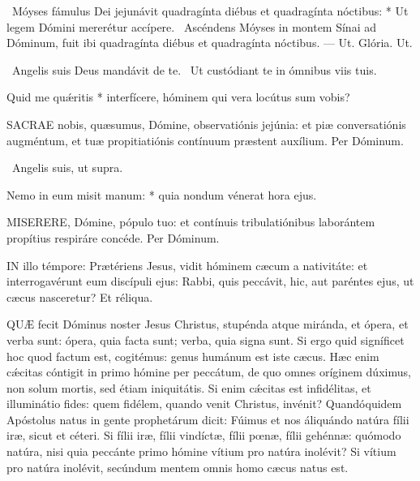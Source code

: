 \R\ Móyses fámulus Dei jejunávit quadragínta diébus et quadragínta nóctibus: * Ut legem Dómini mererétur accípere. \V\ Ascéndens Móyses in montem Sínai ad Dóminum, fuit ibi quadragínta diébus et quadragínta nóctibus. --- Ut. Glória. Ut.

\V\ Angelis suis Deus mandávit de te. \R\ Ut custódiant te in ómnibus viis tuis.

 Quid me quǽritis * interfícere, hóminem qui vera locútus sum vobis?


\lettrine[lines=2]{S}{ACRAE} nobis, quæsumus, Dómine, observatiónis jejúnia: et piæ conversatiónis augméntum, et tuæ propitiatiónis contínuum præstent auxílium. Per Dóminum.

\V\ Angelis suis, ut supra.

 Nemo in eum misit manum: * quia nondum vénerat hora ejus.


\lettrine[lines=2]{M}{ISERERE}, Dómine, pópulo tuo: et contínuis tribulatiónibus laborántem propítius respiráre concéde. Per Dóminum.

\sectionornament




\lettrine[lines=2]{I}{N} illo témpore: Prætériens Jesus, vidit hóminem cæcum a nativitáte: et interrogavérunt eum discípuli ejus: Rabbi, quis peccávit, hic, aut paréntes ejus, ut cæcus nasceretur? Et réliqua.



\lettrine[lines=2]{Q}{UÆ} fecit Dóminus noster Jesus Christus, stupénda atque miránda, et ópera, et verba sunt: ópera, quia facta sunt; verba, quia signa sunt. Si ergo quid signíficet hoc quod factum est, cogitémus: genus humánum est iste cæcus. Hæc enim cǽcitas cóntigit in primo hómine per peccátum, de quo omnes oríginem dúximus, non solum mortis, sed étiam iniquitátis. Si enim cǽcitas est infidélitas, et illuminátio fides: quem fidélem, quando venit Christus, invénit? Quandóquidem Apóstolus natus in gente prophetárum dicit: Fúimus et nos áliquándo natúra fílii iræ, sicut et céteri. Si fílii iræ, fílii vindíctæ, fílii pœnæ, fílii gehénnæ: quómodo natúra, nisi quia peccánte primo hómine vítium pro natúra inolévit? Si vítium pro natúra inolévit, secúndum mentem omnis homo cæcus natus est.

